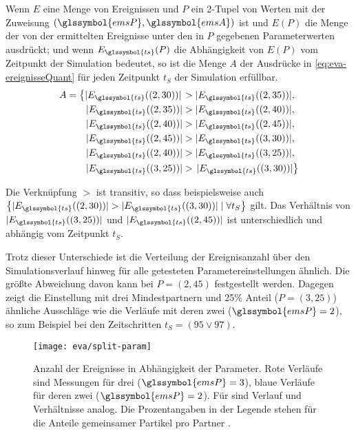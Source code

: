 Wenn $E$ eine Menge von Ereignissen und $P$ ein 2-Tupel von Werten mit der Zuweisung $(\glssymbol{emsP}, \glssymbol{emsA})$ ist und $E(P)$ die Menge der von der  ermittelten Ereignisse unter den in $P$ gegebenen Parameterwerten ausdrückt; und wenn $E_{\glssymbol{ts}}(P)$ die Abhängigkeit von $E(P)$ vom Zeitpunkt  der Simulation bedeutet, so ist die Menge $A$ der Ausdrücke in \autoref{eq:eva-ereignisseQuant} für jeden Zeitpunkt $t_S$ der Simulation erfüllbar.
\begin{equation}
	\begin{aligned}\label{eq:eva-ereignisseQuant}
		A = \left\lbrace |E_{\glssymbol{ts}}((2, 30))|\right. &> |E_{\glssymbol{ts}}((2, 35))|, \\
		|E_{\glssymbol{ts}}((2, 35))| &> |E_{\glssymbol{ts}}((2, 40))|,\\
		|E_{\glssymbol{ts}}((2, 40))| &> |E_{\glssymbol{ts}}((2, 45))|,\\
		|E_{\glssymbol{ts}}((2, 45))| &> |E_{\glssymbol{ts}}((3, 30))|,\\
		|E_{\glssymbol{ts}}((2, 40))| &> |E_{\glssymbol{ts}}((3, 25))|,\\
		|E_{\glssymbol{ts}}((3, 25))| &> \left.|E_{\glssymbol{ts}}((3, 30))| \right\rbrace 
	\end{aligned}
\end{equation}

Die Verknüpfung $>$ ist transitiv, so dass beispielsweise auch $\left\lbrace |E_{\glssymbol{ts}}((2, 30))| > |E_{\glssymbol{ts}}((3, 30))| \; | \; \forall t_S \right\rbrace $ gilt. Das Verhältnis von $|E_{\glssymbol{ts}}((3, 25))|$ und $|E_{\glssymbol{ts}}((2, 45))|$ ist unterschiedlich und abhängig vom Zeitpunkt $t_S$.

Trotz dieser Unterschiede ist die Verteilung der Ereignisanzahl über den Simulationsverlauf hinweg für alle getesteten Parametereinstellungen ähnlich. Die größte Abweichung davon kann bei $P = (2, 45)$ festgestellt werden. Dagegen zeigt die Einstellung mit drei Mindestpartnern und 25\% Anteil ($P = (3, 25)$) ähnliche Ausschläge wie die Verläufe mit deren zwei ($\glssymbol{emsP} = 2$), so zum Beispiel bei den Zeitschritten $t_S = (95 \lor 97)$.

\begin{figure}
	\texttt{[image: eva/split-param]}
	\caption{Anzahl der Ereignisse in Abhängigkeit der Parameter. Rote Verläufe sind Messungen für drei  ($\glssymbol{emsP} = 3$), blaue Verläufe für deren zwei ($\glssymbol{emsP} = 2$). Für  sind Verlauf und Verhältnisse analog. Die Prozentangaben in der Legende stehen für die Anteile gemeinsamer Partikel pro Partner .}\label{fig:eva:split-param}
\end{figure}


